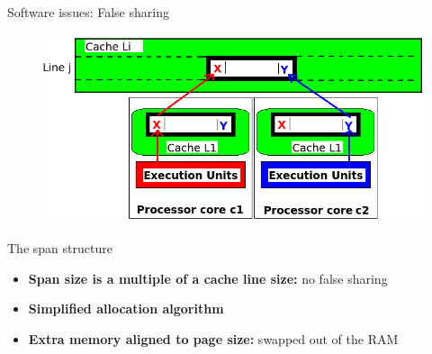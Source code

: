 \documentclass[xcolor=x11names,compress]{beamer}
\renewcommand{\(}{\begin{columns}}
\renewcommand{\)}{\end{columns}}
\newcommand{\<}[1]{\begin{column}{#1}}
\renewcommand{\>}{\end{column}}
\begin{document}

\begin{frame}{Software issues: False sharing}
	\begin{figure}
		\includegraphics[width=1.0\linewidth]{charts/falseSharing.png}
	\end{figure}
\end{frame}



\begin{frame}{The span structure}
	\begin{itemize}
		\item \textbf{Span size is a multiple of a cache line size:} no false sharing
        \item \textbf{Simplified allocation algorithm}
		\item \textbf{Extra memory aligned to page size:} swapped out of the RAM
	\end{itemize}
\end{frame}



\end{document}
